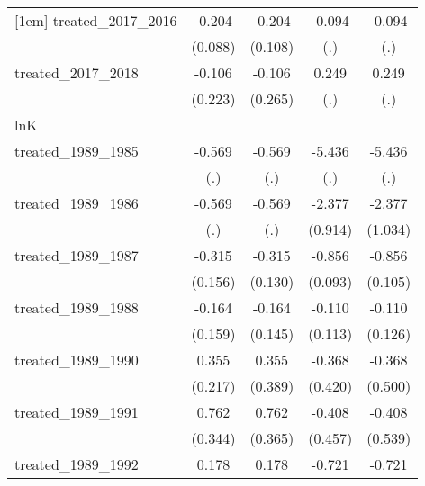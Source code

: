 {\begin{tabular}{l*{4}{c}}
[1em]
treated\_2017\_2016&      -0.204\sym{*}  &      -0.204         &      -0.094         &      -0.094         \\
            &     (0.088)         &     (0.108)         &         (.)         &         (.)         \\
[1em]
treated\_2017\_2018&      -0.106         &      -0.106         &       0.249         &       0.249         \\
            &     (0.223)         &     (0.265)         &         (.)         &         (.)         \\
\hline
lnK         &                     &                     &                     &                     \\
treated\_1989\_1985&      -0.569         &      -0.569         &      -5.436         &      -5.436         \\
            &         (.)         &         (.)         &         (.)         &         (.)         \\
[1em]
treated\_1989\_1986&      -0.569         &      -0.569         &      -2.377\sym{**} &      -2.377\sym{*}  \\
            &         (.)         &         (.)         &     (0.914)         &     (1.034)         \\
[1em]
treated\_1989\_1987&      -0.315\sym{*}  &      -0.315\sym{*}  &      -0.856\sym{***}&      -0.856\sym{***}\\
            &     (0.156)         &     (0.130)         &     (0.093)         &     (0.105)         \\
[1em]
treated\_1989\_1988&      -0.164         &      -0.164         &      -0.110         &      -0.110         \\
            &     (0.159)         &     (0.145)         &     (0.113)         &     (0.126)         \\
[1em]
treated\_1989\_1990&       0.355         &       0.355         &      -0.368         &      -0.368         \\
            &     (0.217)         &     (0.389)         &     (0.420)         &     (0.500)         \\
[1em]
treated\_1989\_1991&       0.762\sym{*}  &       0.762\sym{*}  &      -0.408         &      -0.408         \\
            &     (0.344)         &     (0.365)         &     (0.457)         &     (0.539)         \\
[1em]
treated\_1989\_1992&       0.178         &       0.178         &      -0.721         &      -0.721         \\

\end{tabular}}
